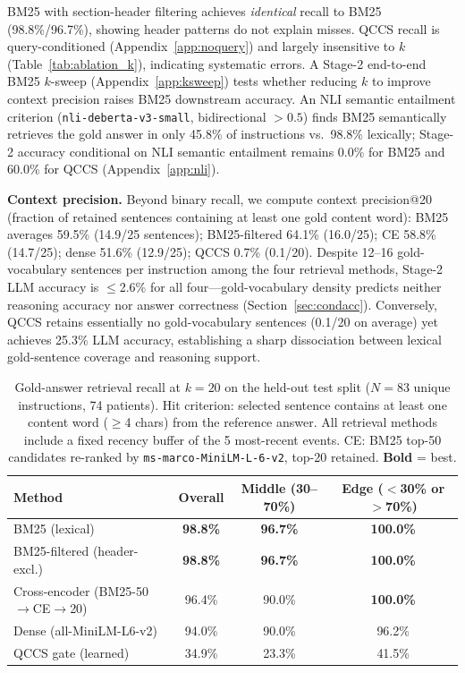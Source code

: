 \documentclass{article}
\begin{document}
BM25 with section-header filtering achieves \emph{identical} recall to BM25
(98.8\%/96.7\%), showing header patterns do not explain misses.
QCCS recall is query-conditioned (Appendix~\ref{app:noquery}) and largely
insensitive to $k$ (Table~\ref{tab:ablation_k}), indicating systematic errors.
A Stage-2 end-to-end BM25 $k$-sweep (Appendix~\ref{app:ksweep}) tests whether
reducing $k$ to improve context precision raises BM25 downstream accuracy.
An NLI semantic entailment criterion (\texttt{nli-deberta-v3-small},
bidirectional $>0.5$) finds BM25 semantically retrieves the gold answer in
only 45.8\% of instructions vs.\ 98.8\% lexically; Stage-2 accuracy conditional
on NLI semantic entailment remains 0.0\% for BM25 and 60.0\% for QCCS
(Appendix~\ref{app:nli}).

\textbf{Context precision.} Beyond binary recall, we compute context precision@20
(fraction of retained sentences containing at least one gold content word):
BM25 averages 59.5\% (14.9/25 sentences); BM25-filtered 64.1\% (16.0/25);
CE 58.8\% (14.7/25); dense 51.6\% (12.9/25); QCCS 0.7\% (0.1/20).
Despite 12--16 gold-vocabulary sentences per instruction among the four
retrieval methods, Stage-2 LLM accuracy is $\leq$2.6\% for all four---gold-vocabulary
density predicts neither reasoning accuracy nor answer correctness
(Section~\ref{sec:condacc}). Conversely, QCCS retains essentially no
gold-vocabulary sentences (0.1/20 on average) yet achieves 25.3\% LLM accuracy,
establishing a sharp dissociation between lexical gold-sentence coverage
and reasoning support.

\begin{table}[t]
\centering
\caption{Gold-answer retrieval recall at $k{=}20$ on the held-out test split
  ($N{=}83$ unique instructions, 74 patients). Hit criterion: selected sentence
  contains at least one content word ($\geq$4 chars) from the reference answer.
  All retrieval methods include a fixed recency buffer of the 5 most-recent events.
  CE: BM25 top-50 candidates re-ranked by \texttt{ms-marco-MiniLM-L-6-v2}, top-20 retained.
  \textbf{Bold} = best.}
\label{tab:qccsgate}
\small
\begin{tabular}{@{}lccc@{}}
\toprule
Method & Overall & Middle (30--70\%) & Edge ($<$30\% or $>$70\%) \\
\midrule
BM25 (lexical) & \textbf{98.8\%} & \textbf{96.7\%} & \textbf{100.0\%} \\
BM25-filtered (header-excl.) & \textbf{98.8\%} & \textbf{96.7\%} & \textbf{100.0\%} \\
Cross-encoder (BM25-50$\to$CE$\to$20) & 96.4\% & 90.0\% & \textbf{100.0\%} \\
Dense (all-MiniLM-L6-v2) & 94.0\% & 90.0\% & 96.2\% \\
QCCS gate (learned) & 34.9\% & 23.3\% & 41.5\% \\
\bottomrule
\end{tabular}
\end{table}
\end{document}
